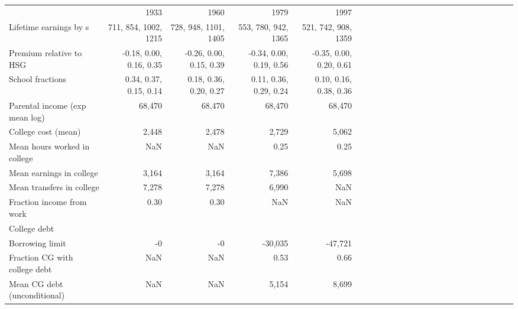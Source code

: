 \begin{tabular}{lrrrrrrrrrrrrrrrrrrrrrrr}
\hline
 & 1933  & 1960  & 1979  & 1997  &   &   &   &   &   &   &   &   &   &   &   &   &   &   &   &   &   &   &   \\ 
Lifetime earnings by s & 711, 854, 1002, 1215  & 728, 948, 1101, 1405  & 553, 780, 942, 1365  & 521, 742, 908, 1359  &   &   &   &   &   &   &   &   &   &   &   &   &   &   &   &   &   &   &   \\ 
Premium relative to HSG & -0.18, 0.00, 0.16, 0.35  & -0.26, 0.00, 0.15, 0.39  & -0.34, 0.00, 0.19, 0.56  & -0.35, 0.00, 0.20, 0.61  &   &   &   &   &   &   &   &   &   &   &   &   &   &   &   &   &   &   &   \\ 
School fractions & 0.34, 0.37, 0.15, 0.14  & 0.18, 0.36, 0.20, 0.27  & 0.11, 0.36, 0.29, 0.24  & 0.10, 0.16, 0.38, 0.36  &   &   &   &   &   &   &   &   &   &   &   &   &   &   &   &   &   &   &   \\ 
Parental income (exp mean log) & 68,470  & 68,470  & 68,470  & 68,470  &   &   &   &   &   &   &   &   &   &   &   &   &   &   &   &   &   &   &   \\ 
College cost (mean) & 2,448  & 2,478  & 2,729  & 5,062  &   &   &   &   &   &   &   &   &   &   &   &   &   &   &   &   &   &   &   \\ 
Mean hours worked in college & NaN  & NaN  & 0.25  & 0.25  &   &   &   &   &   &   &   &   &   &   &   &   &   &   &   &   &   &   &   \\ 
Mean earnings in college & 3,164  & 3,164  & 7,386  & 5,698  &   &   &   &   &   &   &   &   &   &   &   &   &   &   &   &   &   &   &   \\ 
Mean transfers in college & 7,278  & 7,278  & 6,990  & NaN  &   &   &   &   &   &   &   &   &   &   &   &   &   &   &   &   &   &   &   \\ 
Fraction income from work & 0.30  & 0.30  & NaN  & NaN  &   &   &   &   &   &   &   &   &   &   &   &   &   &   &   &   &   &   &   \\ 
College debt &   &   &   &   &   &   &   &   &   &   &   &   &   &   &   &   &   &   &   &   &   &   &   \\ 
Borrowing limit & -0  & -0  & -30,035  & -47,721  &   &   &   &   &   &   &   &   &   &   &   &   &   &   &   &   &   &   &   \\ 
Fraction CG with college debt & NaN  & NaN  & 0.53  & 0.66  &   &   &   &   &   &   &   &   &   &   &   &   &   &   &   &   &   &   &   \\ 
Mean CG debt (unconditional) & NaN  & NaN  & 5,154  & 8,699  &   &   &   &   &   &   &   &   &   &   &   &   &   &   &   &   &   &   &   \\ 
\hline
\end{tabular}%
